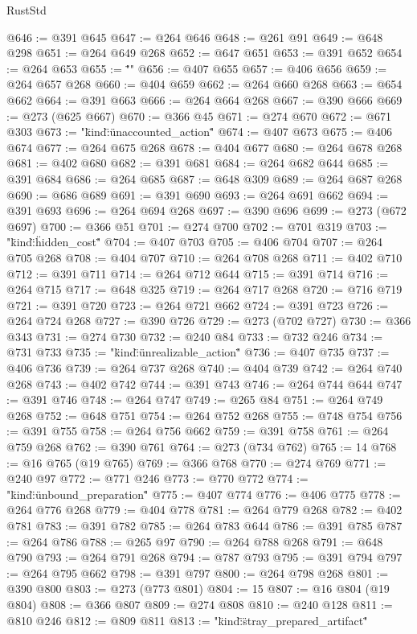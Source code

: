 \begin{lexlean}{RustStd}
\begin{coremodule}
{{{{{{{{{{@646 := @391 @645
@647 := @264 @646
@648 := @261 @91
@649 := @648 @298
@651 := @264 @649 @268
@652 := @647 @651
@653 := @391 @652
@654 := @264 @653
@655 := "\"}"
@656 := @407 @655
@657 := @406 @656
@659 := @264 @657 @268
@660 := @404 @659
@662 := @264 @660 @268
@663 := @654 @662
@664 := @391 @663
@666 := @264 @664 @268
@667 := @390 @666
@669 := @273 (@625 @667)
@670 := @366 @45
@671 := @274 @670
@672 := @671 @303
@673 := "{\"kind\":\"unaccounted_action\""
@674 := @407 @673
@675 := @406 @674
@677 := @264 @675 @268
@678 := @404 @677
@680 := @264 @678 @268
@681 := @402 @680
@682 := @391 @681
@684 := @264 @682 @644
@685 := @391 @684
@686 := @264 @685
@687 := @648 @309
@689 := @264 @687 @268
@690 := @686 @689
@691 := @391 @690
@693 := @264 @691 @662
@694 := @391 @693
@696 := @264 @694 @268
@697 := @390 @696
@699 := @273 (@672 @697)
@700 := @366 @51
@701 := @274 @700
@702 := @701 @319
@703 := "{\"kind\":\"hidden_cost\""
@704 := @407 @703
@705 := @406 @704
@707 := @264 @705 @268
@708 := @404 @707
@710 := @264 @708 @268
@711 := @402 @710
@712 := @391 @711
@714 := @264 @712 @644
@715 := @391 @714
@716 := @264 @715
@717 := @648 @325
@719 := @264 @717 @268
@720 := @716 @719
@721 := @391 @720
@723 := @264 @721 @662
@724 := @391 @723
@726 := @264 @724 @268
@727 := @390 @726
@729 := @273 (@702 @727)
@730 := @366 @343
@731 := @274 @730
@732 := @240 @84
@733 := @732 @246
@734 := @731 @733
@735 := "{\"kind\":\"unrealizable_action\""
@736 := @407 @735
@737 := @406 @736
@739 := @264 @737 @268
@740 := @404 @739
@742 := @264 @740 @268
@743 := @402 @742
@744 := @391 @743
@746 := @264 @744 @644
@747 := @391 @746
@748 := @264 @747
@749 := @265 @84
@751 := @264 @749 @268
@752 := @648 @751
@754 := @264 @752 @268
@755 := @748 @754
@756 := @391 @755
@758 := @264 @756 @662
@759 := @391 @758
@761 := @264 @759 @268
@762 := @390 @761
@764 := @273 (@734 @762)
@765 := 14
@768 := @16 @765 (@19 @765)
@769 := @366 @768
@770 := @274 @769
@771 := @240 @97
@772 := @771 @246
@773 := @770 @772
@774 := "{\"kind\":\"unbound_preparation\""
@775 := @407 @774
@776 := @406 @775
@778 := @264 @776 @268
@779 := @404 @778
@781 := @264 @779 @268
@782 := @402 @781
@783 := @391 @782
@785 := @264 @783 @644
@786 := @391 @785
@787 := @264 @786
@788 := @265 @97
@790 := @264 @788 @268
@791 := @648 @790
@793 := @264 @791 @268
@794 := @787 @793
@795 := @391 @794
@797 := @264 @795 @662
@798 := @391 @797
@800 := @264 @798 @268
@801 := @390 @800
@803 := @273 (@773 @801)
@804 := 15
@807 := @16 @804 (@19 @804)
@808 := @366 @807
@809 := @274 @808
@810 := @240 @128
@811 := @810 @246
@812 := @809 @811
@813 := "{\"kind\":\"stray_prepared_artifact\""
}}}}}}}}}}}}}}
\end{coremodule}
\end{lexlean}
